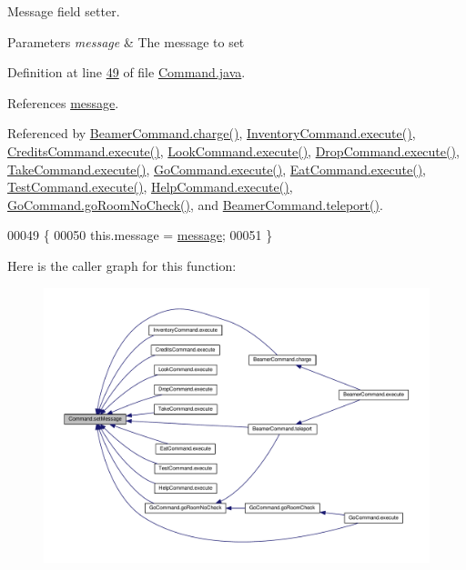 Message field setter. 


\begin{DoxyParams}{Parameters}
{\em message} & The message to set \\
\hline
\end{DoxyParams}


Definition at line \hyperlink{Command_8java_source_l00049}{49} of file \hyperlink{Command_8java_source}{Command.\-java}.



References \hyperlink{Command_8java_source_l00019}{message}.



Referenced by \hyperlink{BeamerCommand_8java_source_l00062}{Beamer\-Command.\-charge()}, \hyperlink{InventoryCommand_8java_source_l00019}{Inventory\-Command.\-execute()}, \hyperlink{CreditsCommand_8java_source_l00019}{Credits\-Command.\-execute()}, \hyperlink{LookCommand_8java_source_l00020}{Look\-Command.\-execute()}, \hyperlink{DropCommand_8java_source_l00021}{Drop\-Command.\-execute()}, \hyperlink{TakeCommand_8java_source_l00022}{Take\-Command.\-execute()}, \hyperlink{GoCommand_8java_source_l00022}{Go\-Command.\-execute()}, \hyperlink{EatCommand_8java_source_l00023}{Eat\-Command.\-execute()}, \hyperlink{TestCommand_8java_source_l00026}{Test\-Command.\-execute()}, \hyperlink{HelpCommand_8java_source_l00028}{Help\-Command.\-execute()}, \hyperlink{GoCommand_8java_source_l00055}{Go\-Command.\-go\-Room\-No\-Check()}, and \hyperlink{BeamerCommand_8java_source_l00045}{Beamer\-Command.\-teleport()}.


\begin{DoxyCode}
00049                                               \{
00050         this.message = \hyperlink{classCommand_a623fd9ca1e1b03cc35a667bc3e67bc78}{message};
00051     \}
\end{DoxyCode}


Here is the caller graph for this function\-:
\nopagebreak
\begin{figure}[H]
\begin{center}
\leavevmode
\includegraphics[width=350pt]{classCommand_a715709d8f0ab65879d79ad1725c96f17_icgraph}
\end{center}
\end{figure}


